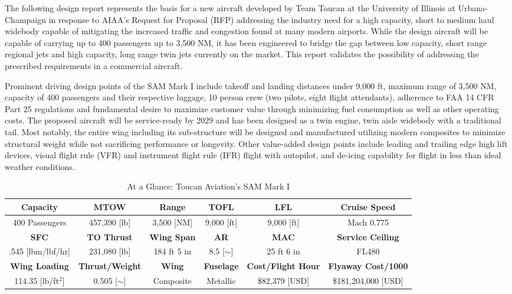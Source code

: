 
The following design report represents the basis for a new aircraft developed by Team Toucan at the University of Illinois at Urbana-Champaign in response to AIAA's Request for Proposal \cite{RFP} (RFP) addressing the industry need for a high capacity, short to medium haul widebody capable of mitigating the increased traffic and congestion found at many modern airports.  While the design aircraft will be capable of carrying up to 400 passengers up to 3,500 NM, it has been engineered to bridge the gap between low capacity, short range regional jets and high capacity, long range twin jets currently on the market.  This report validates the possibility of addressing the prescribed requirements in a commercial aircraft.

 Prominent driving design points of the SAM Mark I include takeoff and landing distances under 9,000 ft, maximum range of 3,500 NM, capacity of 400 passengers and their respective luggage, 10 person crew (two pilots, eight flight attendants), adherence to FAA 14 CFR Part 25 regulations and fundamental desire to maximize customer value through minimizing fuel consumption as well as other operating costs.  The proposed aircraft will be service-ready by 2029 and has been designed as a twin engine, twin aisle widebody with a traditional tail.  Most notably, the entire wing including its sub-structure will be designed and manufactured utilizing modern composites to minimize structural weight while not sacrificing performance or longevity.  Other value-added design points include leading and trailing edge high lift devices, visual flight rule (VFR) and instrument flight rule (IFR) flight with autopilot, and de-icing capability for flight in less than ideal weather conditions.

\begin{table}[!h] 
    \centering
    \caption{At a Glance: Toucan Aviation's SAM Mark I}
    \begin{tabular}{ |c|c|c|c|c|c| }\toprule
    \textbf{Capacity} & \textbf{MTOW} & \textbf{Range} & \textbf{TOFL} & \textbf{LFL} & \textbf{Cruise Speed} \\\hline 
    400 Passengers & 457,390 [lb] & 3,500 [NM] & 9,000 [ft] & 9,000 [ft] & Mach 0.775  \\\hline \hline
    \textbf{SFC} & \textbf{TO Thrust} & \textbf{Wing Span} & \textbf{AR} & \textbf{MAC} & \textbf{Service Ceiling}  \\\hline 
    .545 [lbm/lbf/hr] & 231,080 [lb] & 184 ft 5 in & 8.5 [$\sim$] & 25 ft 6 in & FL480  \\\hline \hline
    \textbf{Wing Loading} & \textbf{Thrust/Weight} & \textbf{Wing} & \textbf{Fuselage} & \textbf{Cost/Flight Hour} & \textbf{Flyaway Cost/1000}  \\\hline 
    114.35 [lb/ft$^2$] & 0.505 [$\sim$] & Composite & Metallic & \$82,379 [USD] & \$181,204,000 [USD] \\ \bottomrule

    \end{tabular}\label{tab:ataglance}
\end{table}

